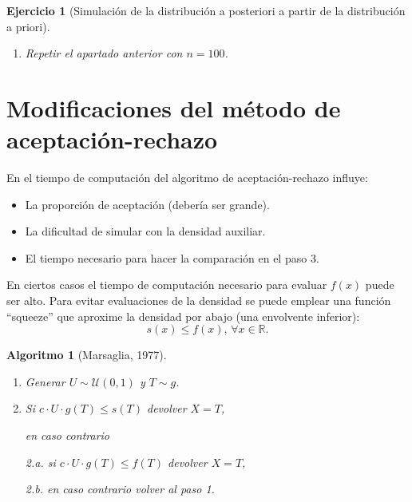 \documentclass[
  10pt,
]{book}
\theoremstyle{break}
\newtheorem{conjecture}{Algoritmo}[chapter]
\newtheorem{exercise}{Ejercicio}[chapter]
\theoremstyle{nonumberplain}
\begin{document}
\begin{exercise}[Simulación de la distribución a posteriori a partir de la distribución a priori]
\begin{enumerate}
  \begin{figure}[!htbp]

  {\centering \texttt{[image: 04-Metodos\_generales\_continuas\_files/figure-latex/ic-bayes-1]} 

  }

  \caption{Distribución de los valores generados y aproximación del intervalo de credibilidad.}\label{fig:ic-bayes}
  \end{figure}
\item
  Repetir el apartado anterior con \(n=100\).
\end{enumerate}

\end{exercise}

\hypertarget{modAR}{%
\section{Modificaciones del método de aceptación-rechazo}\label{modAR}}

En el tiempo de computación del algoritmo de aceptación-rechazo influye:

\begin{itemize}
\item
  La proporción de aceptación (debería ser grande).
\item
  La dificultad de simular con la densidad auxiliar.
\item
  El tiempo necesario para hacer la comparación en el paso 3.
\end{itemize}

En ciertos casos el tiempo de computación necesario para evaluar \(f(x)\) puede ser alto.
Para evitar evaluaciones de la densidad se puede emplear una función ``squeeze'' que aproxime la densidad por abajo (una envolvente inferior):
\[s(x)\leq f(x) \text{, }\forall x\in \mathbb{R}.\]

\begin{conjecture}[Marsaglia, 1977]
\protect\hypertarget{cnj:marsaglia}{}\label{cnj:marsaglia}

\begin{enumerate}
\def\labelenumi{\arabic{enumi}.}
\item
  Generar \(U \sim \mathcal{U}(0, 1)\) y \(T\sim g\).
\item
  Si \(c\cdot U\cdot g(T) \leq s(T)\) devolver \(X=T\),

  en caso contrario

  2.a. si \(c\cdot U\cdot g(T) \leq f(T)\)
  devolver \(X=T\),

  2.b. en caso contrario volver al paso 1.
\end{enumerate}

\end{conjecture}
\end{document}
